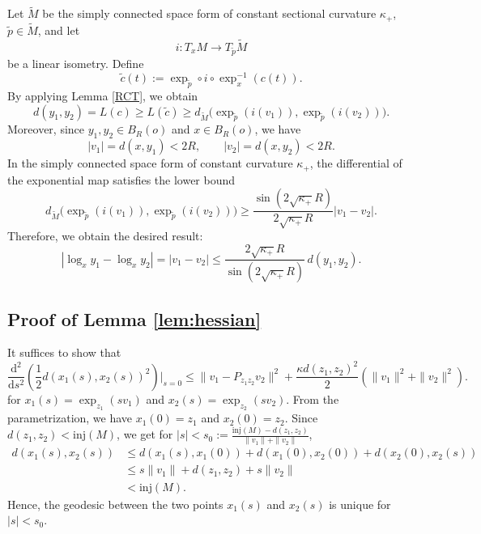 \documentclass[11pt]{amsart}
\def\d{\mathrm{d}}
\newcommand{\p}{o}%
\newcommand{\dist}{d}%
\newcommand{\inj}{\mathrm{inj}}%
\begin{document}
Let $\tilde M$ be the simply connected space form of constant sectional curvature $\kappa_+$,   $\tilde p\in \tilde M$, and let
\[
i:T_xM\to T_{\tilde p}\tilde M
\]
be a linear isometry. Define
\[
\tilde c(t):=\exp_{\tilde p}\circ i\circ \exp_x^{-1}(c(t)).
\]
By applying Lemma \ref{RCT}, we obtain
\[
\dist(y_1,y_2)=L(c)\ge L(\tilde c)
\ge
\dist_{\tilde M}\bigl(\exp_{\tilde p}(i(v_1)),\exp_{\tilde p}(i(v_2))\bigr).
\]
Moreover, since $y_1,y_2\in B_R(\p)$ and $x\in B_R(\p)$, we have
\[
|v_1|=\dist(x,y_1)<2R,
\qquad
|v_2|=\dist(x,y_2)<2R.
\]
In the simply connected space form of constant curvature $\kappa_+$, the differential of the exponential map satisfies the lower bound \cite{Petersen2016}
\[
\dist_{\tilde M}\bigl(\exp_{\tilde p}(i(v_1)),\exp_{\tilde p}(i(v_2))\bigr)
\ge
\frac{\sin(2\sqrt{\kappa_+}R)}{2\sqrt{\kappa_+}R}|v_1-v_2|.
\] 
Therefore, we obtain the desired result:
\[
|\log_x y_1-\log_x y_2|
=
|v_1-v_2|
\le
\frac{2\sqrt{\kappa_+}R}{\sin(2\sqrt{\kappa_+}R)}\,\dist(y_1,y_2).
\]





\subsection{Proof of Lemma \ref{lem:hessian}}\label{proof:lem:hessian}
It suffices to show that
\[
\frac{\d^2}{\d s^2}\left(\frac{1}{2}\dist(x_1(s), x_2(s))^2\right)\bigg|_{s=0}\leq \|v_1-P_{z_1z_2}v_2\|^2+\frac{\kappa \dist(z_1, z_2)^2}{2}\left(\|v_1\|^2+\|v_2\|^2\right).
\]
for $x_1(s)=\exp_{z_1}(sv_1)$ and $x_2(s)=\exp_{z_2}(sv_2)$. From the parametrization, we have $x_1(0)=z_1$ and $x_2(0)=z_2$. Since $\dist(z_1, z_2)<\inj(M)$, we get for $|s|<s_0:=\frac{\inj(M)-\dist(z_1, z_2)}{\|v_1\|+\|v_2\|}$, 
\begin{align*}
\dist\left(x_1(s), x_2(s)\right)&\leq \dist(x_1(s), x_1(0))+\dist(x_1(0), x_2(0))+\dist(x_2(0), x_2(s))\\
&\leq s\|v_1\|+\dist(z_1, z_2)+s\|v_2\|\\
&<\inj(M).
\end{align*}
Hence, the geodesic between the two points $x_1(s)$ and $x_2(s)$ is unique for $|s|<s_0$.
\end{document}
